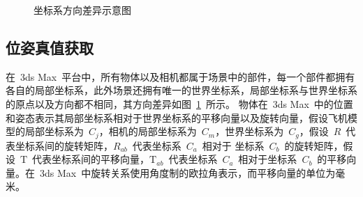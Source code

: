 \begin{figure}[b] %
  \centering%
    \vskip0.3cm
  \caption{坐标系方向差异示意图}
  \label{fig:chap03:diff_axis}
  \end{figure}


\subsection{位姿真值获取}
\label{sec:dataset_3ds_max}
在~3ds Max~平台中，所有物体以及相机都属于场景中的部件，每一个部件都拥有各自的局部坐标系，此外场景还拥有唯一的世界坐标系，局部坐标系与世界坐标系的原点以及方向都不相同，其方向差异如图~\ref{fig:chap03:diff_axis}~所示。
物体在~3ds Max~中的位置和姿态表示其局部坐标系相对于世界坐标系的平移向量以及旋转向量，假设飞机模型的局部坐标系为~$C_j$，相机的局部坐标系为~$C_m$，世界坐标系为~$C_g$，假设~$R$~代表坐标系间的旋转矩阵，$R_{ab}$~代表坐标系~$C_a$~相对于
坐标系~$C_b$~的旋转矩阵，假设~$\textrm{T}$~代表坐标系间的平移向量，$\textrm{T}_{ab}$~代表坐标系~$C_a$~相对于坐标系~$C_b$~的平移向量。在~3ds Max~中旋转关系使用角度制的欧拉角表示，而平移向量的单位为毫米。

